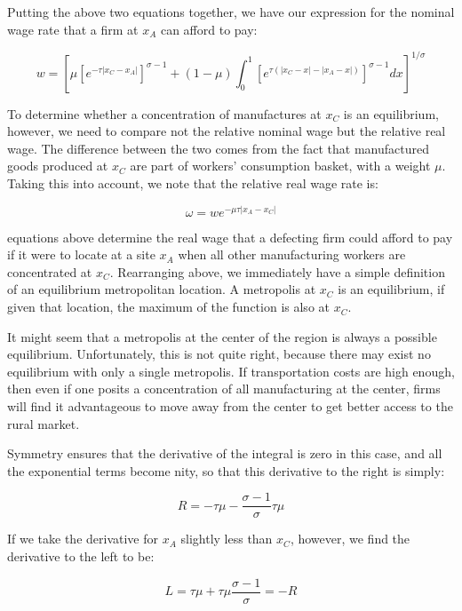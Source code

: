 Putting the above two equations together, we have our expression for the nominal wage rate that a firm at $x_A$ can afford to pay:

\begin{equation}
    w = [\mu [e^{-\tau |x_C - x_A|}]^{\sigma - 1} + (1 - \mu) \int_0^1 [e^{\tau (|x_C - x| - |x_A - x|)}]^{\sigma - 1} dx]^{1 / \sigma}
\end{equation}

To determine whether a concentration of manufactures at $x_C$ is an equilibrium, however, we need to compare not the relative nominal wage but the relative real wage. The difference between the two comes from the fact that manufactured goods produced at $x_C$ are part of workers' consumption basket, with a weight $\mu$. Taking this into account, we note that the relative real wage rate is:

\begin{equation}
    \omega = w e^{-\mu \tau |x_A - x_C|}
\end{equation}

equations above determine the real wage that a defecting firm could afford to pay if it were to locate at a site $x_A$ when all other manufacturing workers are concentrated at $x_C$. Rearranging above, we immediately have a simple definition of an equilibrium metropolitan location. A metropolis at $x_C$ is an equilibrium, if given that location, the maximum of the function is also at $x_C$.

It might seem that a metropolis at the center of the region is always a possible equilibrium. Unfortunately, this is not quite right, because there may exist no equilibrium with only a single metropolis. If transportation costs are high enough, then even if one posits a concentration of all manufacturing at the center, firms will find it advantageous to move away from the center to get better access to the rural market.

Symmetry ensures that the derivative of the integral is zero in this case, and all the exponential terms become nity, so that this derivative to the right is simply:

\begin{equation}
    R = -\tau \mu - \frac{\sigma - 1}{\sigma} \tau \mu
\end{equation}

If we take the derivative for $x_A$ slightly less than $x_C$, however, we find the derivative to the left to be:

\begin{equation}
    L = \tau \mu + \tau \mu \frac{\sigma - 1}{\sigma} = -R
\end{equation}

